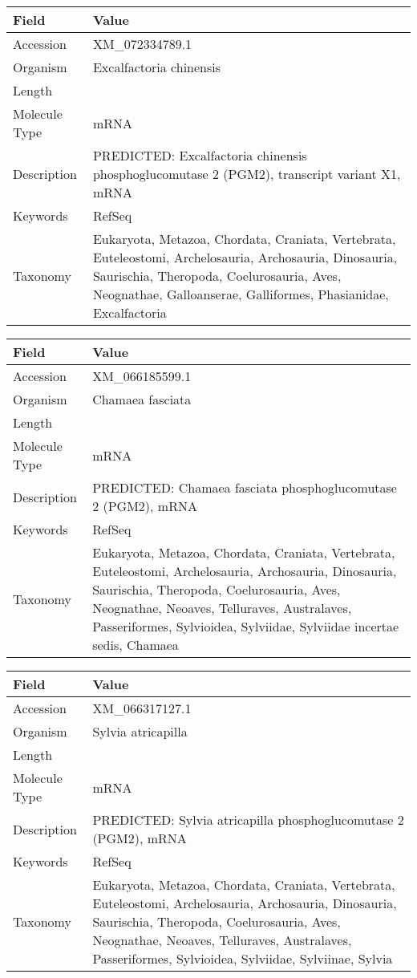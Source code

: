 \documentclass[10pt]{article}
\begin{document}
{\footnotesize
\begin{longtable}{>{\raggedright\arraybackslash}p{4.5cm} >{\raggedright\arraybackslash}p{11.5cm}}
\textbf{Field} & \textbf{Value} \\
\hline
Accession & XM\_072334789.1 \\
Organism & Excalfactoria chinensis \\
Length & 4233 \\
Molecule Type & mRNA \\
Description & PREDICTED: Excalfactoria chinensis phosphoglucomutase 2 (PGM2), transcript variant X1, mRNA \\
Keywords & RefSeq \\
Taxonomy & Eukaryota, Metazoa, Chordata, Craniata, Vertebrata, Euteleostomi, Archelosauria, Archosauria, Dinosauria, Saurischia, Theropoda, Coelurosauria, Aves, Neognathae, Galloanserae, Galliformes, Phasianidae, Excalfactoria \\
\end{longtable}
}

{\footnotesize
\begin{longtable}{>{\raggedright\arraybackslash}p{4.5cm} >{\raggedright\arraybackslash}p{11.5cm}}
\textbf{Field} & \textbf{Value} \\
\hline
Accession & XM\_066185599.1 \\
Organism & Chamaea fasciata \\
Length & 2184 \\
Molecule Type & mRNA \\
Description & PREDICTED: Chamaea fasciata phosphoglucomutase 2 (PGM2), mRNA \\
Keywords & RefSeq \\
Taxonomy & Eukaryota, Metazoa, Chordata, Craniata, Vertebrata, Euteleostomi, Archelosauria, Archosauria, Dinosauria, Saurischia, Theropoda, Coelurosauria, Aves, Neognathae, Neoaves, Telluraves, Australaves, Passeriformes, Sylvioidea, Sylviidae, Sylviidae incertae sedis, Chamaea \\
\end{longtable}
}

{\footnotesize
\begin{longtable}{>{\raggedright\arraybackslash}p{4.5cm} >{\raggedright\arraybackslash}p{11.5cm}}
\textbf{Field} & \textbf{Value} \\
\hline
Accession & XM\_066317127.1 \\
Organism & Sylvia atricapilla \\
Length & 2156 \\
Molecule Type & mRNA \\
Description & PREDICTED: Sylvia atricapilla phosphoglucomutase 2 (PGM2), mRNA \\
Keywords & RefSeq \\
Taxonomy & Eukaryota, Metazoa, Chordata, Craniata, Vertebrata, Euteleostomi, Archelosauria, Archosauria, Dinosauria, Saurischia, Theropoda, Coelurosauria, Aves, Neognathae, Neoaves, Telluraves, Australaves, Passeriformes, Sylvioidea, Sylviidae, Sylviinae, Sylvia \\
\end{longtable}
}
\end{document}
